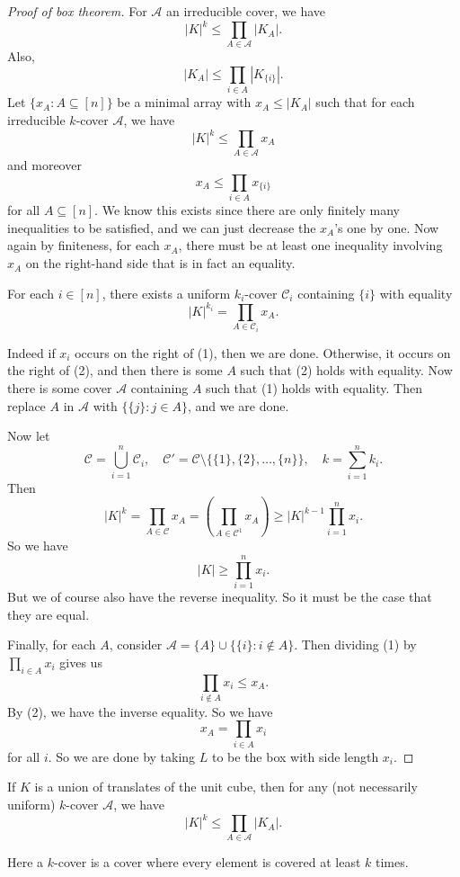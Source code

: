 \documentclass[a4paper]{article}
\begin{document}
\begin{proof}[Proof of box theorem]
  For $\mathcal{A}$ an irreducible cover, we have
  \[
    |K|^k \leq \prod_{A \in \mathcal{A}} |K_A|.
  \]
  Also,
  \[
    |K_A| \leq \prod_{i \in A} |K_{\{i\}}|.
  \]
  Let $\{x_A: A \subseteq [n]\}$ be a minimal array with $x_A \leq |K_A|$ such that for each irreducible $k$-cover $\mathcal{A}$, we have
  \[
    |K|^k \leq \prod_{A \in \mathcal{A}} x_A\tag{$1$}
  \]
  and moreover
  \[
    x_A \leq \prod_{i \in A} x_{\{i\}}\tag{$2$}
  \]
  for all $A \subseteq [n]$. We know this exists since there are only finitely many inequalities to be satisfied, and we can just decrease the $x_A$'s one by one. Now again by finiteness, for each $x_A$, there must be at least one inequality involving $x_A$ on the right-hand side that is in fact an equality.

  \begin{claim}
    For each $i \in [n]$, there exists a uniform $k_i$-cover $\mathcal{C}_i$ containing $\{i\}$ with equality
    \[
      |K|^{k_i} = \prod_{A \in \mathcal{C}_i} x_A.
    \]
  \end{claim}

  Indeed if $x_i$ occurs on the right of (1), then we are done. Otherwise, it occurs on the right of (2), and then there is some $A$ such that (2) holds with equality. Now there is some cover $\mathcal{A}$ containing $A$ such that (1) holds with equality. Then replace $A$ in $\mathcal{A}$ with $\{ \{j\}: j \in A\}$, and we are done.

  Now let
  \[
    \mathcal{C} = \bigcup_{i = 1}^n \mathcal{C}_i,\quad
    \mathcal{C}' = \mathcal{C} \setminus \{\{1\}, \{2\}, \ldots, \{n\}\},\quad
    k = \sum_{i = 1}^n k_i.
  \]
  Then
  \[
    |K|^k = \prod_{A \in \mathcal{C}} x_A = \left(\prod_{A \in \mathcal{C}^1} x_A\right)\geq |K|^{k - 1} \prod_{i = 1}^n x_i.
  \]
  So we have
  \[
    |K| \geq \prod_{i = 1}^n x_i.
  \]
  But we of course also have the reverse inequality. So it must be the case that they are equal.

  Finally, for each $A$, consider $\mathcal{A} = \{A\} \cup \{ \{i\} : i \not \in A\}$. Then dividing (1) by $\prod_{i \in A} x_i$ gives us
  \[
    \prod_{i \not \in A} x_i \leq x_A.
  \]
  By (2), we have the inverse equality. So we have
  \[
    x_A = \prod_{i \in A} x_i
  \]
  for all $i$. So we are done by taking $L$ to be the box with side length $x_i$.
\end{proof}

\begin{cor}
  If $K$ is a union of translates of the unit cube, then for any (not necessarily uniform) $k$-cover $\mathcal{A}$, we have
  \[
    |K|^k \leq \prod_{A \in \mathcal{A}} |K_A|.
  \]
\end{cor}
Here a $k$-cover is a cover where every element is covered at least $k$ times.
\end{document}
